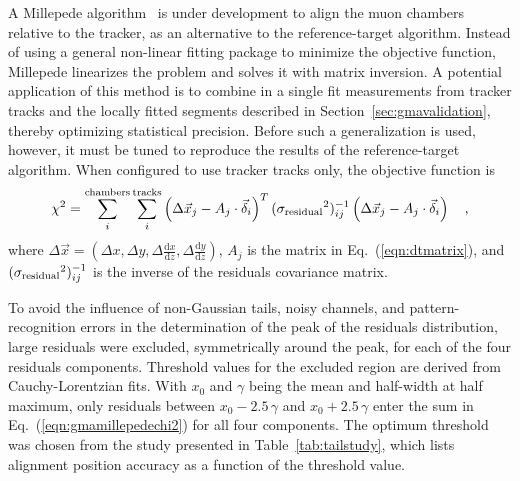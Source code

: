 \documentclass[11pt,twoside,a4paper,cmspaper]{cms-tdr}
\begin{document}
A Millepede algorithm~\cite{Blobel:2006yh} is under development to
align the muon chambers relative to the tracker, as an alternative to
the reference-target algorithm.  Instead of using a general non-linear
fitting package to minimize the objective function, Millepede
linearizes the problem and solves it with matrix inversion.  A
potential application of this method is to combine in a single fit
measurements from tracker tracks and the locally fitted segments
described in Section~\ref{sec:gmavalidation}, thereby optimizing
statistical precision.  Before such a generalization is used, however,
it must be tuned to reproduce the results of the reference-target
algorithm.  When configured to use tracker tracks only, the objective
function is
\begin{equation}
\chi^2 = \sum_i^{\mbox{\scriptsize chambers}} \sum_i^{\mbox{\scriptsize tracks}}
\left(\Delta \vec{x}_j - A_j \cdot \vec{\delta}_i\right)^T
({\sigma_{\mbox{\scriptsize residual}}}^2)^{-1}_{ij}
\left(\Delta \vec{x}_j - A_j \cdot \vec{\delta}_i\right) \quad\mbox{,}
\label{eqn:gmamillepedechi2}
\end{equation}
where $\Delta \vec{x} = (\Delta x, \Delta
y, \Delta \frac{\textrm{d}x}{\textrm{d}z}, \Delta \frac{\textrm{d}y}{\textrm{d}z})$, $A_j$ is the
matrix in Eq.~(\ref{eqn:dtmatrix}), and
$({\sigma_{\mbox{\scriptsize residual}}}^2)^{-1}_{ij}$ is the inverse
of the residuals covariance matrix.

To avoid the influence of non-Gaussian tails, noisy channels, and
pattern-recognition errors in the determination of the peak of the residuals distribution,
large residuals were excluded, symmetrically around the peak, for
each of the four residuals components.  Threshold values for the
excluded region are derived from Cauchy-Lorentzian fits.  With $x_0$ and
$\gamma$ being the mean and half-width at half maximum,
only residuals between $x_0 - 2.5 \, \gamma$ and $x_0 + 2.5 \, \gamma$
enter the sum in Eq.~(\ref{eqn:gmamillepedechi2}) for all
four components.  The
optimum threshold was chosen from the study presented in
Table~\ref{tab:tailstudy}, which lists alignment position accuracy as
a function of the threshold value.
\end{document}
